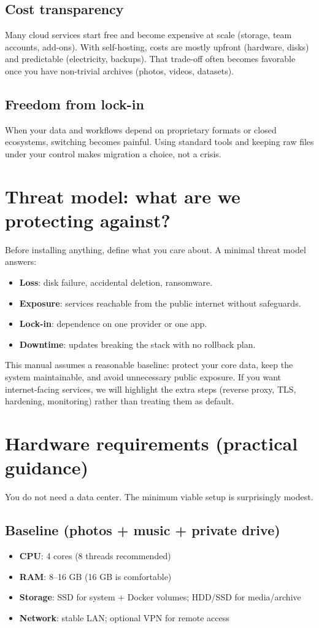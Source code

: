 \subsection{Cost transparency}
Many cloud services start free and become expensive at scale (storage, team accounts, add-ons). With self-hosting, costs are mostly upfront (hardware, disks) and predictable (electricity, backups). That trade-off often becomes favorable once you have non-trivial archives (photos, videos, datasets).

\subsection{Freedom from lock-in}
When your data and workflows depend on proprietary formats or closed ecosystems, switching becomes painful. Using standard tools and keeping raw files under your control makes migration a choice, not a crisis.

\section{Threat model: what are we protecting against?}
Before installing anything, define what you care about. A minimal threat model answers:
\begin{itemize}[leftmargin=*]
  \item \textbf{Loss}: disk failure, accidental deletion, ransomware.
  \item \textbf{Exposure}: services reachable from the public internet without safeguards.
  \item \textbf{Lock-in}: dependence on one provider or one app.
  \item \textbf{Downtime}: updates breaking the stack with no rollback plan.
\end{itemize}

This manual assumes a reasonable baseline: protect your core data, keep the system maintainable, and avoid unnecessary public exposure. If you want internet-facing services, we will highlight the extra steps (reverse proxy, TLS, hardening, monitoring) rather than treating them as default.

\section{Hardware requirements (practical guidance)}
You do not need a data center. The minimum viable setup is surprisingly modest.

\subsection{Baseline (photos + music + private drive)}
\begin{itemize}[leftmargin=*]
  \item \textbf{CPU}: 4 cores (8 threads recommended)
  \item \textbf{RAM}: 8--16 GB (16 GB is comfortable)
  \item \textbf{Storage}: SSD for system + Docker volumes; HDD/SSD for media/archive
  \item \textbf{Network}: stable LAN; optional VPN for remote access
\end{itemize}

